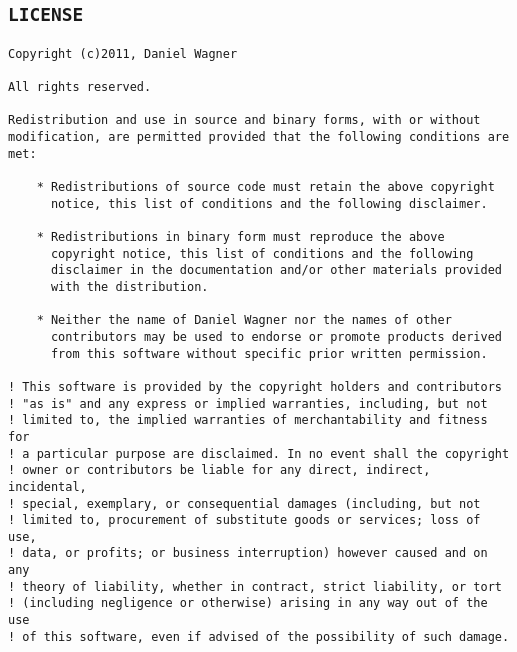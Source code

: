 \subsection{\texttt{LICENSE}}
\begin{verbatim}
Copyright (c)2011, Daniel Wagner

All rights reserved.

Redistribution and use in source and binary forms, with or without
modification, are permitted provided that the following conditions are met:

    * Redistributions of source code must retain the above copyright
      notice, this list of conditions and the following disclaimer.

    * Redistributions in binary form must reproduce the above
      copyright notice, this list of conditions and the following
      disclaimer in the documentation and/or other materials provided
      with the distribution.

    * Neither the name of Daniel Wagner nor the names of other
      contributors may be used to endorse or promote products derived
      from this software without specific prior written permission.

! This software is provided by the copyright holders and contributors
! "as is" and any express or implied warranties, including, but not
! limited to, the implied warranties of merchantability and fitness for
! a particular purpose are disclaimed. In no event shall the copyright
! owner or contributors be liable for any direct, indirect, incidental,
! special, exemplary, or consequential damages (including, but not
! limited to, procurement of substitute goods or services; loss of use,
! data, or profits; or business interruption) however caused and on any
! theory of liability, whether in contract, strict liability, or tort
! (including negligence or otherwise) arising in any way out of the use
! of this software, even if advised of the possibility of such damage.

\end{verbatim}


